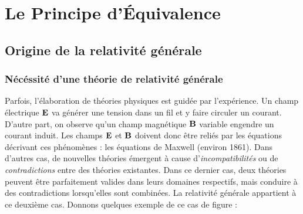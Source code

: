 \chapter{Le Principe d'Équivalence}

\section{Origine de la relativité générale}


\subsection{Nécéssité d'une théorie de relativité générale}
Parfois, l'élaboration de théories physiques est guidée par l'expérience. Un champ électrique $\bm{\mathrm{E}}$ va générer une tension dans un fil et y faire circuler un courant. D'autre part, on observe qu'un champ magnétique $\bm{\mathrm{B}}$ variable engendre un courant induit. Les champs $\bm{\mathrm{E}}$ et $\bm{\mathrm{B}}$ doivent donc être reliés par les équations décrivant ces phénomènes : les équations de Maxwell (environ 1861).
Dans d'autres cas, de nouvelles théories émergent à cause d'\emph{incompatibilités} ou de \emph{contradictions} entre des théories existantes. Dans ce dernier cas, deux théories peuvent être parfaitement valides dans leurs domaines respectifs, mais conduire à des contradictions lorsqu'elles sont combinées. La relativité générale appartient à ce deuxième cas. Donnons quelques exemple de ce cas de figure :

